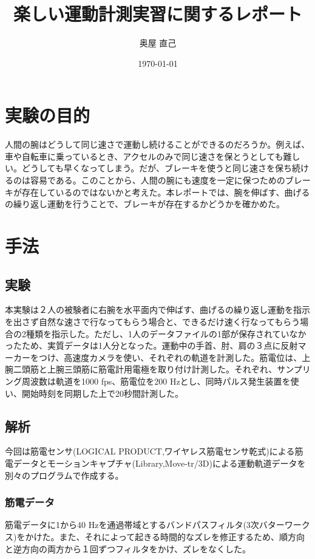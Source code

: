 \documentclass{jsarticle}
\title{楽しい運動計測実習に関するレポート}
\date{\today}
\author{奥屋 直己}
\begin{document}
\maketitle

\section{実験の目的}

人間の腕はどうして同じ速さで運動し続けることができるのだろうか。例えば、車や自転車に乗っているとき、アクセルのみで同じ速さを保とうとしても難しい。どうしても早くなってしまう。だが、ブレーキを使うと同じ速さを保ち続けるのは容易である。このことから、人間の腕にも速度を一定に保つためのブレーキが存在しているのではないかと考えた。本レポートでは、腕を伸ばす、曲げるの繰り返し運動を行うことで、ブレーキが存在するかどうかを確かめた。

\section{手法}

\subsection{実験}

本実験は２人の被験者に右腕を水平面内で伸ばす、曲げるの繰り返し運動を指示を出さず自然な速さで行なってもらう場合と、できるだけ速く行なってもらう場合の2種類を指示した。ただし、1人のデータファイルの1部が保存されていなかったため、実質データは1人分となった。運動中の手首、肘、肩の３点に反射マーカーをつけ、高速度カメラを使い、それぞれの軌道を計測した。筋電位は、上腕二頭筋と上腕三頭筋に筋電計用電極を取り付け計測した。それぞれ、サンプリング周波数は軌道を1000 fps、筋電位を200 Hzとし、同時パルス発生装置を使い、開始時刻を同期した上で20秒間計測した。
\subsection{解析}

今回は筋電センサ(LOGICAL PRODUCT,ワイヤレス筋電センサ乾式)による筋電データとモーションキャプチャ(Library,Move-tr/3D)による運動軌道データを別々のプログラムで作成する。

\subsubsection{筋電データ}

筋電データに1から40 Hzを通過帯域とするバンドパスフィルタ(3次バターワークス)をかけた。また、それによって起きる時間的なズレを修正するため、順方向と逆方向の両方から１回ずつフィルタをかけ、ズレをなくした。
\end{document}
